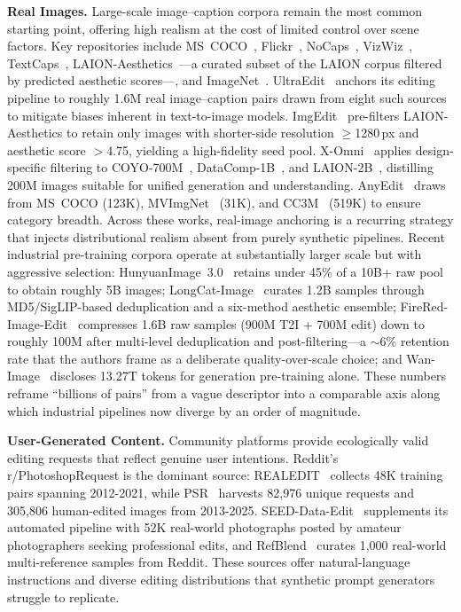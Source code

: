 \textbf{Real Images.}
Large-scale image--caption corpora remain the most common starting point, offering high realism at the cost of limited control over scene factors. Key repositories include MS~COCO~\citep{lin2014microsoft}, Flickr~\citep{young2014image}, NoCaps~\citep{agrawal2019nocaps}, VizWiz~\citep{gurari2018vizwiz}, TextCaps~\citep{sidorov2020textcaps}, LAION-Aesthetics~\citep{schuhmann2022laion}---a curated subset of the LAION corpus filtered by predicted aesthetic scores---, and ImageNet~\citep{deng2009imagenet}. UltraEdit~\citep{zhao2024ultraedit} anchors its editing pipeline to roughly 1.6M real image--caption pairs drawn from eight such sources to mitigate biases inherent in text-to-image models. ImgEdit~\citep{ye2025imgedit} pre-filters LAION-Aesthetics to retain only images with shorter-side resolution $\geq$1280\,px and aesthetic score $>$4.75, yielding a high-fidelity seed pool. X-Omni~\citep{geng2025x} applies design-specific filtering to COYO-700M~\citep{kakaobrain2022coyo-700m}, DataComp-1B~\citep{gadre2023datacomp}, and LAION-2B~\citep{schuhmann2022laion}, distilling 200M images suitable for unified generation and understanding. AnyEdit~\citep{yu2025anyedit} draws from MS~COCO (123K), MVImgNet~\citep{yu2023mvimgnet} (31K), and CC3M~\citep{sharma2018conceptual} (519K) to ensure category breadth. Across these works, real-image anchoring is a recurring strategy that injects distributional realism absent from purely synthetic pipelines. Recent industrial pre-training corpora operate at substantially larger scale but with aggressive selection: HunyuanImage~3.0~\citep{cao2025hunyuanimage} retains under 45\% of a 10B+ raw pool to obtain roughly 5B images; LongCat-Image~\citep{team2025longcat} curates 1.2B samples through MD5/SigLIP-based deduplication and a six-method aesthetic ensemble; FireRed-Image-Edit~\citep{team2026firered} compresses 1.6B raw samples (900M T2I + 700M edit) down to roughly 100M after multi-level deduplication and post-filtering---a $\sim$6\% retention rate that the authors frame as a deliberate quality-over-scale choice; and Wan-Image~\citep{mao2026wan} discloses 13.27T tokens for generation pre-training alone. These numbers reframe ``billions of pairs'' from a vague descriptor into a comparable axis along which industrial pipelines now diverge by an order of magnitude.

\textbf{User-Generated Content.}
Community platforms provide ecologically valid editing requests that reflect genuine user intentions. Reddit's r/PhotoshopRequest is the dominant source: REALEDIT~\citep{sushko2025realedit} collects 48K training pairs spanning 2012-2021, while PSR~\citep{taesiri2025understanding} harvests 82,976 unique requests and 305,806 human-edited images from 2013-2025. SEED-Data-Edit~\citep{ge2024seed} supplements its automated pipeline with 52K real-world photographs posted by amateur photographers seeking professional edits, and RefBlend~\citep{chen2025multiref} curates 1,000 real-world multi-reference samples from Reddit. These sources offer natural-language instructions and diverse editing distributions that synthetic prompt generators struggle to replicate.

